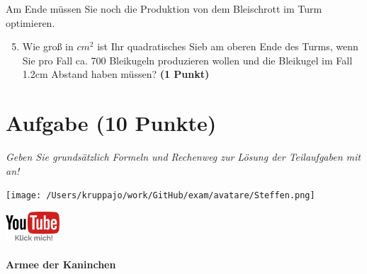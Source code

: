 \documentclass[a4paper, 9pt]{scrartcl}\usepackage[]{graphicx}\usepackage[]{xcolor}
\begin{document}
Am Ende müssen Sie noch die Produktion von dem Bleischrott im Turm optimieren.

\begin{enumerate}
  \setcounter{enumi}{4}
\item Wie gro{\ss} in $cm^2$ ist Ihr quadratisches Sieb am oberen Ende des Turms,
  wenn Sie pro Fall ca. 700 Bleikugeln produzieren wollen und
  die Bleikugel im Fall 1.2cm Abstand haben müssen?  \textbf{(1
    Punkt)}
\end{enumerate}
 
\clearpage

\section{Aufgabe \hfill (10 Punkte)}

\textit{Geben Sie grundsätzlich Formeln und Rechenweg zur Lösung der Teilaufgaben mit an!} \\[1Ex]
 

 
\ifcollection
\begin{flushright}
\tiny\vspace{-3Ex}
\textbf{\examinhaltstart}
\exammodulemathstat
\vspace{-4Ex}
\end{flushright}
\begin{minipage}[t]{0.5\textwidth}
\texttt{[image: /Users/kruppajo/work/GitHub/exam/avatare/Steffen.png]}
\end{minipage}
\begin{minipage}[t]{0.5\textwidth}
\hfill
\href{https://youtu.be/Mr6eslls4J0}{\includegraphics[width = 2cm]{img/youtube}}
\end{minipage}
\fi



\ifcollection
\paragraph{Armee der Kaninchen}
\fi
\end{document}
